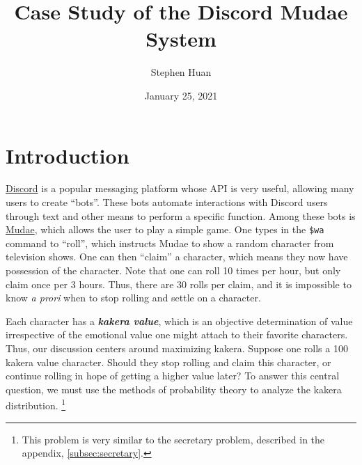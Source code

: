 \documentclass[11pt, oneside]{article}
\title{Case Study of the Discord Mudae System}
\author{Stephen Huan}
\date{January 25, 2021}
\newcommand{\emphasis}[1]{\textbf{\textit{#1}}}
\theoremstyle{plain}
\theoremstyle{definition}
\begin{document}
\maketitle
\setcounter{tocdepth}{3} %
{\hypersetup{linkcolor=black}
\tableofcontents
\listofalgorithms
}
\newpage

\section{Introduction} \label{sec:intro}
\href{https://discord.com/}{Discord} is a popular messaging platform
whose API is very useful, allowing many users to create \enquote{bots}.
These bots automate interactions with Discord users through text
and other means to perform a specific function. Among these bots is
\href{https://top.gg/bot/432610292342587392}{Mudae}, which allows the
user to play a simple game. One types in the \texttt{\$wa} command to
\enquote{roll}, which instructs Mudae to show a random character from
television shows. One can then \enquote{claim} a character, which means
they now have possession of the character. Note that one can roll 10
times per hour, but only claim once per 3 hours. Thus, there are 30
rolls per claim, and it is impossible to know \textit{a prori} when
to stop rolling and settle on a character.

Each character has a \emphasis{kakera value}, which is an objective
determination of value irrespective of the emotional value one might
attach to their favorite characters. Thus, our discussion centers around
maximizing kakera. Suppose one rolls a 100 kakera value character. Should
they stop rolling and claim this character, or continue rolling in hope of
getting a higher value later? To answer this central question, we must use
the methods of probability theory to analyze the kakera distribution.
\footnote{This problem is very similar to the secretary problem,
described in the appendix, \autoref{subsec:secretary}.}
\end{document}
